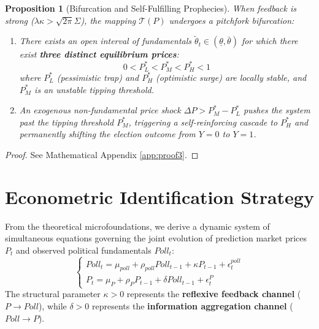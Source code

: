 \documentclass[12pt]{article}
\newtheorem{proposition}{Proposition}
\begin{document}
\begin{proposition}[Bifurcation and Self-Fulfilling Prophecies]
\label{prop:bifurcation}
When feedback is strong ($\lambda \kappa > \sqrt{2\pi}\Sigma$), the mapping $\mathcal{T}(P)$ undergoes a pitchfork bifurcation:
\begin{enumerate}
    \item There exists an open interval of fundamentals $\tilde{\theta}_t \in (\underline{\theta}, \bar{\theta})$ for which there exist \textbf{three distinct equilibrium prices}:
    \begin{equation}
    0 < P_L^* < P_M^* < P_H^* < 1
    \end{equation}
    where $P_L^*$ (pessimistic trap) and $P_H^*$ (optimistic surge) are locally stable, and $P_M^*$ is an unstable tipping threshold.
    \item An exogenous non-fundamental price shock $\Delta P > P_M^* - P_L^*$ pushes the system past the tipping threshold $P_M^*$, triggering a self-reinforcing cascade to $P_H^*$ and permanently shifting the election outcome from $Y=0$ to $Y=1$.
\end{enumerate}
\end{proposition}
\begin{proof}
See Mathematical Appendix \ref{app:proof3}.
\end{proof}

\section{Econometric Identification Strategy}

From the theoretical microfoundations, we derive a dynamic system of simultaneous equations governing the joint evolution of prediction market prices $P_t$ and observed political fundamentals $Poll_t$:
\begin{equation}
\label{eq:svar_sys}
\begin{cases}
Poll_t = \mu_{poll} + \rho_{poll} Poll_{t-1} + \kappa P_{t-1} + \epsilon_t^{poll} \\
P_t = \mu_P + \rho_P P_{t-1} + \delta Poll_{t-1} + \epsilon_t^P
\end{cases}
\end{equation}
The structural parameter $\kappa > 0$ represents the \textbf{reflexive feedback channel} ($P \to Poll$), while $\delta > 0$ represents the \textbf{information aggregation channel} ($Poll \to P$).
\end{document}
